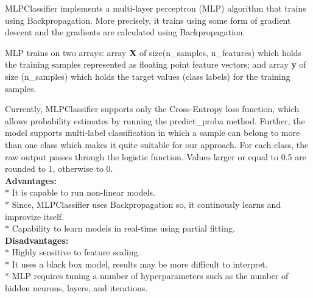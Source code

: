 \documentclass[a4paper, 10pt, conference]{IEEEtran}
\begin{document}
MLPClassifier implements a multi-layer perceptron (MLP) algorithm that trains using Backpropagation. More precisely, it trains using some form of gradient descent and the gradients are calculated using Backpropagation.

MLP trains on two arrays: array \textbf{X} of size(n\_samples, n\_features) which holds the training samples represented as floating point feature vectors; and array \textbf{y} of size (n\_samples) which holds the target values (class labels) for the training samples. 

Currently, MLPClassifier supports only the Cross-Entropy loss function, which allows probability estimates by running the predict\_proba method. 
Further, the model supports multi-label classification in which a sample can belong to more than one class which makes it quite suitable for our approach. For each class, the raw output passes through the logistic function. Values larger or equal to 0.5 are rounded to 1, otherwise to 0.\\

\textbf{Advantages:}
\\$\ast$ It is capable to run non-linear models.
\\$\ast$ Since, MLPClassifier uses Backpropagation so, it continously learns and improvize itself.
\\$\ast$ Capability to learn models in real-time using partial fitting.\\

\textbf{Disadvantages:}
\\$\ast$ Highly sensitive to feature scaling.
\\$\ast$ It uses a black box model,  results may be more difficult to interpret. 
\\$\ast$ MLP requires tuning a number of hyperparameters such as the number of hidden neurons, layers, and iterations.
\end{document}
